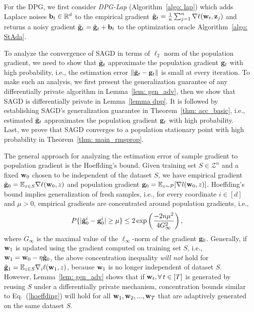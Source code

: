 \documentclass[11pt]{article}
\begin{document}
For the DPG, we first consider
\emph{DPG-Lap} (Algorithm~\ref{algo: lap}) which adds Laplace noises $\mathbf{b}_t \in \mathbb{R}^d$ to the empirical gradient $\hat {\mathbf{g}}_t = \frac{1}{n} \sum_{j=1}^n\nabla \ell(\mathbf{w}_t, \mathbf{z}_j)$ and returns a noisy gradient $\tilde {\mathbf{g}}_t = \hat {\mathbf{g}}_t + \mathbf{b}_t$ to the optimization oracle Algorithm~\ref{algo: StAda}. 

To analyze the convergence of \textsc{SAGD} in terms of $\ell_2$ norm of the population gradient, we need to 
show that $\tilde {\mathbf{g}}_t$ approximate the population gradient $\mathbf{g}_t$ with high probability, i.e., the estimation error $\| \tilde {\mathbf{g}}_t - \mathbf{g}_t\|$ is small at every iteration.  To make such an analysis, we first present the generalization guarantee of any differentially private algorithm in Lemma~\ref{lem: gen_adv}, then we show that \textsc{SAGD} is differentially private in Lemma~\ref{lemma dpp}. It is followed by establishing \textsc{SAGD}'s generalization guarantee in Theorem~\ref{thm: acc_basic}, i.e., estimated $\tilde {\mathbf{g}}_t$ approximates the population gradient $\mathbf{g}_t$ with high probability. Last, we prove that \textsc{SAGD} converges to a population stationary point with high probability in Theorem~\ref{thm: main_rmsprop}.


The general approach for analyzing the estimation error of sample gradient to population gradient is the Hoeffding’s bound. 
Given training set $S \in \mathcal{Z}^n$ and a fixed $\mathbf{w}_0$ chosen to be independent of the dataset $S$,  we have empirical gradient $\hat {\mathbf{g}}_0= \mathbb{E}_{z \in S}\nabla \ell(\mathbf{w}_0,z)$ and population gradient $\mathbf{g}_0 = \mathbb{E}_{z\sim \mathcal{P}}[\nabla l(\mathbf{w}_0,z)]$. Hoeffding’s bound implies generalization of fresh samples, i.e., for every coordinate $i \in [d]$ and $\mu > 0$,  empirical gradients are concentrated around population gradients, i.e., 
	\begin{equation} \label{hoeffding}
	P\{|\hat {\mathbf{g}}^i_0 - \mathbf{g}_0^i | \geq \mu \} \leq2 \exp \left(\frac{-2n\mu^2}{4G_\infty^2} \right),
	\end{equation}
 where $G_\infty$ is the maximal value of the $\ell_\infty$-norm of the gradient $ \mathbf{g}_0$. Generally, if $\mathbf{w}_1$ is updated using the gradient computed on training set $S$, i.e., $\mathbf{w}_1 = \mathbf{w}_0 - \eta \hat {\mathbf{g}}_0$, the above concentration inequality \emph{will not} hold for $\hat {\mathbf{g}}_1 = \mathbb{E}_{z \in S}\nabla_i \ell(\mathbf{w}_1,z)$, because $\mathbf{w}_1$ is no longer independent of dataset $S$. However, Lemma~\ref{lem: gen_adv} shows that if $\mathbf{w}_t, \forall\, t \in [T]$ is generated by reusing $S$ under a differentially private mechanism, concentration bounds similar to Eq.~(\ref{hoeffding}) will hold for all $\mathbf{w}_1, \mathbf{w}_2,...,\mathbf{w}_T$ that are adaptively generated on the same dataset $S$. 
\end{document}
